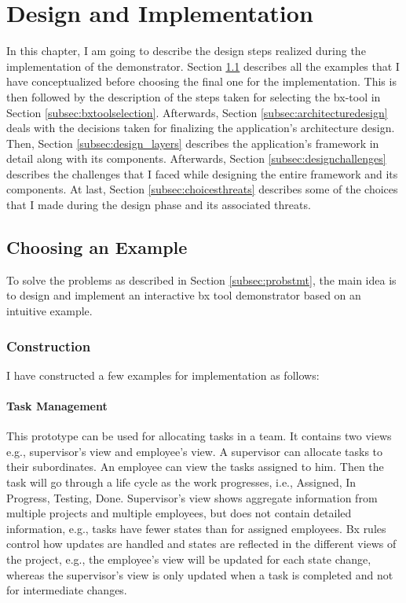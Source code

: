 \section{Design and Implementation}\label{sec:design}
In this chapter, I am going to describe the design steps realized during the implementation of the demonstrator. Section \ref{subsec:exampleforimplementation} describes all the examples that I have conceptualized before choosing the final one for the implementation. This is then followed by the description of the steps taken for selecting the bx-tool in Section \ref{subsec:bxtoolselection}. Afterwards, Section \ref{subsec:architecturedesign} deals with the decisions taken for finalizing the application's architecture design. Then, Section \ref{subsec:design_layers} describes the application's framework in detail along with its components. Afterwards, Section \ref{subsec:designchallenges} describes the challenges that I faced while designing the entire framework and its components. At last, Section \ref{subsec:choicesthreats} describes some of the choices that I made during the design phase and its associated threats. 

\subsection{Choosing an Example}\label{subsec:exampleforimplementation}
To solve the problems as described in Section \ref{subsec:probstmt}, the main idea is to design and implement an interactive bx tool demonstrator based on an intuitive example.

\subsubsection{Construction}\label{subsubsec:exampleconstruction}
I have constructed a few examples for implementation as follows:

\paragraph{Task Management} This prototype can be used for allocating tasks in a team. It contains two views e.g., supervisor's view and employee's view. A supervisor can allocate tasks to their subordinates. An employee can view the tasks assigned to him. Then the task will go through a life cycle as the work progresses, i.e., Assigned, In Progress, Testing, Done. Supervisor's view shows aggregate information from multiple projects and multiple employees, but does not contain detailed information, e.g., tasks have fewer states than for assigned employees. Bx rules control how updates are handled and states are reflected in the different views of the project, e.g., the employee's view will be updated for each state change, whereas the supervisor's view is only updated when a task is completed and not for intermediate changes.

